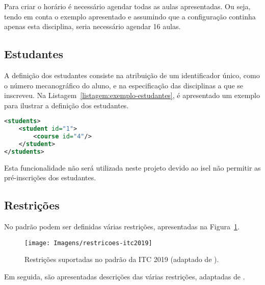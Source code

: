Para criar o horário é necessário agendar todas as aulas apresentadas. Ou seja, tendo em conta o exemplo apresentado e assumindo que a configuração continha apenas esta disciplina, seria necessário agendar 16 aulas.


\subsection{Estudantes}

A definição dos estudantes consiste na atribuição de um identificador único, como o número mecanográfico do aluno, e na especificação das disciplinas a que se inscreveu. Na Listagem~\ref{listagem:exemplo-estudantes}, é apresentado um exemplo para ilustrar a definição dos estudantes.

\begin{lstlisting}[language=XML, float, caption={Exemplo da definição dos estudantes.}, label={listagem:exemplo-estudantes}]
<students>
    <student id="1">
        <course id="4"/>
    </student>
</students>
\end{lstlisting}

Esta funcionalidade não será utilizada neste projeto devido ao \gls{isel} não permitir as pré-inscrições dos estudantes.

\subsection{Restrições}

No padrão podem ser definidas várias restrições, apresentadas na Figura~\ref{fig:restricoes-itc2019}.

\begin{figure}[ht]
    \centering
    \texttt{[image: Imagens/restricoes-itc2019]}
    \caption{Restrições suportadas no padrão da ITC 2019 (adaptado de \cite{itc2019-Website}).}
    \label{fig:restricoes-itc2019}
\end{figure}

Em seguida, são apresentadas descrições das várias restrições, adaptadas de \cite{itc2019-Website}.

